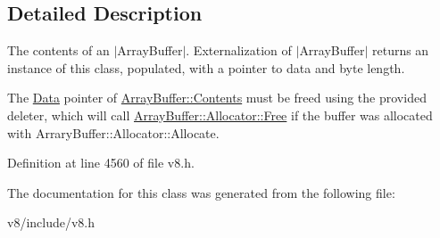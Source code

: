 \subsection{Detailed Description}
The contents of an $\vert$\+Array\+Buffer$\vert$. Externalization of $\vert$\+Array\+Buffer$\vert$ returns an instance of this class, populated, with a pointer to data and byte length.

The \mbox{\hyperlink{classv8_1_1Data}{Data}} pointer of \mbox{\hyperlink{classv8_1_1ArrayBuffer_1_1Contents}{Array\+Buffer\+::\+Contents}} must be freed using the provided deleter, which will call \mbox{\hyperlink{classv8_1_1ArrayBuffer_1_1Allocator_a419f59d2a103a5a8863809d7977c9cd8}{Array\+Buffer\+::\+Allocator\+::\+Free}} if the buffer was allocated with Arrary\+Buffer\+::\+Allocator\+::\+Allocate. 

Definition at line 4560 of file v8.\+h.



The documentation for this class was generated from the following file\+:\begin{DoxyCompactItemize}
\item 
v8/include/v8.\+h\end{DoxyCompactItemize}
